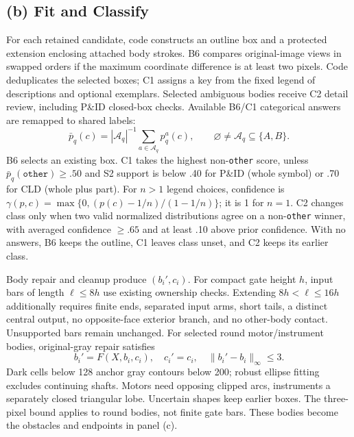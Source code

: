 \documentclass[sigconf,review]{acmart}
\begin{document}
\subsection{(b) Fit and Classify}
\label{sec:fit}
For each retained candidate, code constructs an outline box and a protected extension enclosing attached body strokes. B6 compares original-image views in swapped orders if the maximum coordinate difference is at least two pixels. Code deduplicates the selected boxes; C1 assigns a key from the fixed legend of descriptions and optional exemplars. Selected ambiguous bodies receive C2 detail review, including P\&ID closed-box checks. Available B6/C1 categorical answers are remapped to shared labels:
\begin{equation}
 \bar p_q(c)=|\mathcal A_q|^{-1}\sum_{a\in\mathcal A_q}p_q^a(c),
 \qquad \varnothing\ne\mathcal A_q\subseteq\{A,B\}.
 \label{eq:cat}
\end{equation}
B6 selects an existing box. C1 takes the highest non-\texttt{other} score, unless $\bar p_q(\texttt{other})\ge .50$ and S2 support is below .40 for P\&ID (whole symbol) or .70 for CLD (whole plus part). For $n>1$ legend choices, confidence is $\gamma(p,c)=\max\{0,(p(c)-1/n)/(1-1/n)\}$; it is 1 for $n=1$. C2 changes class only when two valid normalized distributions agree on a non-\texttt{other} winner, with averaged confidence $\ge .65$ and at least .10 above prior confidence. With no answers, B6 keeps the outline, C1 leaves class unset, and C2 keeps its earlier class.

Body repair and cleanup produce $(b_i',c_i)$. For compact gate height $h$, input bars of length $\ell\le8h$ use existing ownership checks. Extending $8h<\ell\le16h$ additionally requires finite ends, separated input arms, short tails, a distinct central output, no opposite-face exterior branch, and no other-body contact. Unsupported bars remain unchanged. For selected round motor/instrument bodies, original-gray repair satisfies
\begin{equation}
 b_i'=F(X,b_i,c_i),\quad c_i'=c_i,\quad
 \|b_i'-b_i\|_\infty\le3.
 \label{eq:body}
\end{equation}
Dark cells below 128 anchor gray contours below 200; robust ellipse fitting excludes continuing shafts. Motors need opposing clipped arcs, instruments a separately closed triangular lobe. Uncertain shapes keep earlier boxes. The three-pixel bound applies to round bodies, not finite gate bars. These bodies become the obstacles and endpoints in panel (c).
\end{document}
